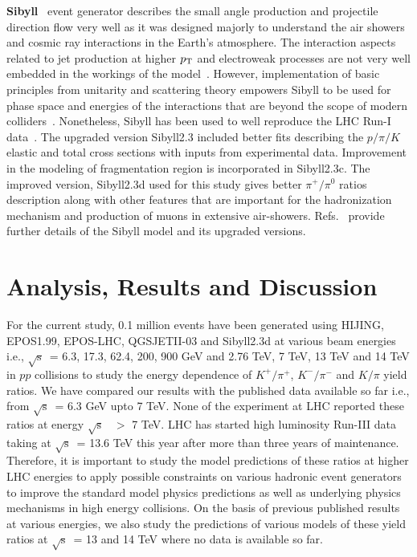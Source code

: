 \documentclass{article}
\newcommand{\sqrts}{\mbox{$\sqrt{\mathrm{s}}$}}
\newcommand{\ppt}{$p_{\rm T}$}
\begin{document}
{ \bf Sibyll}~\cite{Riehn:2019jet} event generator describes the small angle production and projectile direction flow very well as it was designed majorly to understand the air showers and cosmic ray interactions in the Earth’s atmosphere. The interaction aspects related to jet production at higher {\ppt} and electroweak processes are not very well embedded in the workings of the model~\cite{Riehn:2019jet}. However, implementation of basic principles from unitarity and scattering theory empowers Sibyll to be used for phase space and energies of the interactions that are beyond the scope of modern colliders~\cite{Riehn:2017mfm}. Nonetheless, Sibyll has been used to well reproduce the LHC Run-I data~\cite{Riehn:2019jet}. The upgraded version Sibyll2.3 included better fits describing the $p/\pi/K$ elastic and total cross sections with inputs from experimental data. Improvement in the modeling of fragmentation region is incorporated in Sibyll2.3c. The improved version, Sibyll2.3d used for this study gives better $\pi^{+}/\pi^{0}$ ratios description along with other features that are important for the hadronization mechanism and production of muons in extensive air-showers. Refs.~\cite{Riehn:2019jet, Riehn:2017mfm, CMS:2015zrm} provide further details of the Sibyll model and its upgraded versions. 

\section{Analysis, Results and Discussion}\label{sec3}

For the current study, 0.1 million events have been generated using HIJING, EPOS1.99, EPOS-LHC, QGSJETII-03 and Sibyll2.3d at various beam energies i.e., \sqrts~= 6.3, 17.3, 62.4, 200, 900 GeV and 2.76 TeV, 7 TeV, 13 TeV and 14 TeV in $pp$ collisions to study the energy dependence of $K^+/\pi^+$, $K^-/\pi^-$ and $K/\pi$ yield ratios. We have compared our results with the published data available so far i.e., from \sqrts~= 6.3 GeV upto 7 TeV. None of the experiment at LHC reported these ratios at energy \sqrts~ $>$ 7 TeV. LHC has started high luminosity Run-III data taking at \sqrts~= 13.6 TeV this year after more than three years of maintenance. Therefore, it is important to study the model predictions of these ratios at higher LHC energies to apply possible constraints on various hadronic event generators to improve the standard model physics predictions as well as underlying physics mechanisms in high energy collisions. On the basis of previous published results at various energies, we also study the predictions of various models of these yield ratios at \sqrts~= 13 and 14 TeV where no data is available so far. 
\end{document}
